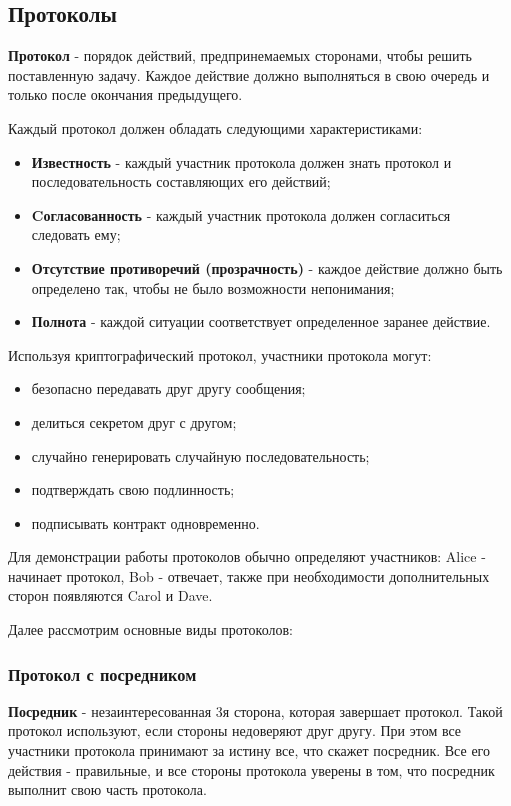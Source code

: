 \documentclass[a4paper]{article}
\begin{document}
\subsection{Протоколы}
\textbf{Протокол} - порядок действий, предпринемаемых сторонами, чтобы решить поставленную задачу. Каждое действие должно выполняться в свою очередь и только
после окончания предыдущего.
\par
Каждый протокол должен обладать следующими характеристиками:
\begin{itemize}
    \item \textbf{Известность} - каждый участник протокола должен знать протокол и последовательность составляющих его действий;
    \item \textbf{Cогласованность} - каждый участник протокола должен согласиться следовать ему;
    \item \textbf{Отсутствие противоречий (прозрачность)} - каждое действие должно быть определено так, чтобы не было возможности непонимания;
    \item \textbf{Полнота} -  каждой ситуации соответствует определенное заранее действие.
\end{itemize}

Используя криптографический протокол, участники протокола могут:
\begin{itemize}
    \item безопасно передавать друг другу сообщения;
    \item делиться секретом друг с другом;
    \item случайно генерировать случайную последовательность;
    \item подтверждать свою подлинность;
    \item подписывать контракт одновременно.
\end{itemize}

Для демонстрации работы протоколов обычно определяют участников: Alice - начинает протокол, Bob - отвечает, также при необходимости дополнительных сторон появляются Carol и Dave.
\par 
Далее рассмотрим основные виды протоколов: \par
\subsubsection{Протокол с посредником}
\textbf{Посредник} - незаинтересованная 3я сторона, которая завершает протокол. Такой протокол используют, если стороны недоверяют друг другу. При этом все участники протокола принимают за истину все, что скажет посредник. 
Все его действия - правильные, и все стороны протокола уверены в том, что посредник выполнит свою часть протокола.
\end{document}
